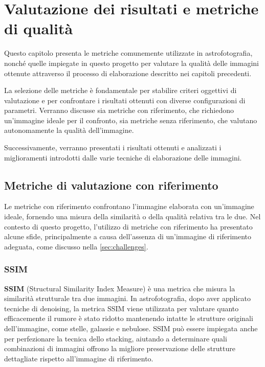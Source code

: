 \chapter{Valutazione dei risultati e metriche di qualità} \label{chap:evaluation}

Questo capitolo presenta le metriche comunemente utilizzate in astrofotografia, nonché quelle impiegate in questo progetto per valutare la qualità delle immagini ottenute attraverso il processo di elaborazione descritto nei capitoli precedenti.

La selezione delle metriche è fondamentale per stabilire criteri oggettivi di valutazione e per confrontare i risultati ottenuti con diverse configurazioni di parametri. Verranno discusse sia metriche con riferimento, che richiedono un'immagine ideale per il confronto, sia metriche senza riferimento, che valutano autonomamente la qualità dell'immagine.

Successivamente, verranno presentati i risultati ottenuti e analizzati i miglioramenti introdotti dalle varie tecniche di elaborazione delle immagini.


\section{Metriche di valutazione con riferimento} \label{sec:r_metrics}

Le metriche con riferimento confrontano l'immagine elaborata con un'immagine ideale, fornendo una misura della similarità o della qualità relativa tra le due. Nel contesto di questo progetto, l'utilizzo di metriche con riferimento ha presentato alcune sfide, principalmente a causa dell'assenza di un'immagine di riferimento adeguata, come discusso nella \cref{sec:challenges}.

\subsection{SSIM} \label{subsec:ssim}

\textbf{SSIM} (Structural Similarity Index Measure) è una metrica che misura la similarità strutturale tra due immagini. In astrofotografia, dopo aver applicato tecniche di denoising, la metrica SSIM viene utilizzata per valutare quanto efficacemente il rumore è stato ridotto mantenendo intatte le strutture originali dell'immagine, come stelle, galassie e nebulose. SSIM può essere impiegata anche per perfezionare la tecnica dello stacking, aiutando a determinare quali combinazioni di immagini offrono la migliore preservazione delle strutture dettagliate rispetto all'immagine di riferimento.

